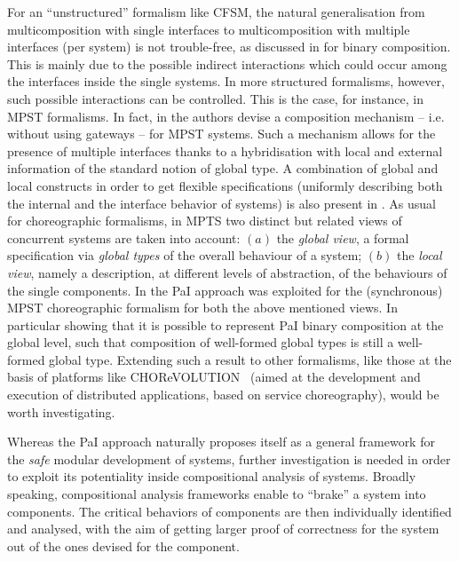 For an ``unstructured'' formalism like CFSM,
the natural generalisation from multicomposition with
single interfaces to multicomposition with multiple interfaces  (per system)  is not trouble-free,
as discussed in \cite[Sect.6]{BdLH19} for binary composition.
This is mainly due to the possible indirect  interactions  which could occur  among the interfaces inside the single systems.
In more structured formalisms, however, such possible interactions can be controlled. 
This is the case, for instance, in MPST formalisms.
In fact, in \cite{GY23} the authors devise a  
 \efr composition mechanism \bfr -- i.e. \efr without using gateways -- for MPST systems.
Such a mechanism allows for the presence of multiple interfaces thanks to a hybridisation with local and external information of the standard notion of global type.  
A combination of global and local constructs in order to get flexible specifications
(uniformly describing both the internal and the interface behavior of systems) is also present in \cite{CV10}.
\bfr
As usual for choreographic formalisms, in MPTS  
two distinct but related views of concurrent systems are taken into account:
$(a)$ the {\em global view}, a formal specification via {\em global types} of the overall behaviour 
of a system; $(b)$ the {\em local view}, namely a description, at different  levels 
of abstraction, of the behaviours of the single components. 
In \cite{BDLT21} the PaI approach was exploited for the (synchronous) MPST choreographic formalism
for both the above mentioned views. In particular showing that it is possible to represent 
PaI binary composition at the global level, such that composition of well-formed global types
is still a well-formed global type. Extending such a result to other formalisms, like those
at the basis of platforms like CHOReVOLUTION~\cite{CHOReVOLUTION} (aimed at the development and execution of distributed applications, based on service choreography), would be worth investigating.


Whereas the PaI approach naturally proposes itself as a general framework for the {\em safe} modular 
development of systems, further investigation is needed in order to exploit its potentiality
inside compositional analysis of systems. 
Broadly speaking, compositional analysis frameworks enable to ``brake'' a system into components.
The critical behaviors of components
are then individually identified and analysed, with the aim of getting larger proof of correctness for
the system out of the ones devised for the component.

